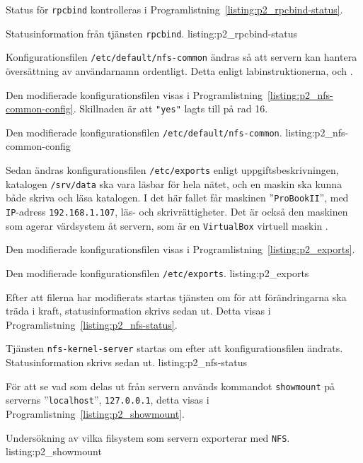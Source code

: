 Status för \texttt{rpcbind} kontrolleras i
Programlistning~\ref{listing:p2_rpcbind-status}.

            {Statusinformation från tjänsten \texttt{rpcbind}.}
            {listing:p2_rpcbind-status}


Konfigurationsfilen \texttt{/etc/default/nfs-common} ändras så att servern kan
hantera översättning av användarnamn ordentligt.
Detta enligt labinstruktionerna\cite{dvg001:instruktionerLab5},
\cite{ubuntu:NFSv4howto} och \cite{ubuntu:settingupNFShowto}.

Den modifierade konfigurationsfilen visas i
Programlistning~\ref{listing:p2_nfs-common-config}.
Skillnaden är att \texttt{"yes"} lagts till på rad 16.

            {Den modifierade konfigurationsfilen \texttt{/etc/default/nfs-common}.}
            {listing:p2_nfs-common-config}

Sedan ändras konfigurationsfilen \texttt{/etc/exports} enligt
uppgiftsbeskrivningen, katalogen \texttt{/srv/data} ska vara läsbar för hela
nätet, och en maskin ska kunna både skriva och läsa katalogen. 
I det här fallet får maskinen ''\texttt{ProBookII}'', med \texttt{IP}-adress
\texttt{192.168.1.107}, läs- och skrivrättigheter. Det är också den maskinen
som agerar värdsystem åt servern, som är en \texttt{VirtualBox} virtuell maskin .

Den modifierade konfigurationsfilen visas i
Programlistning~\ref{listing:p2_exports}.

            {Den modifierade konfigurationsfilen \texttt{/etc/exports}.}
            {listing:p2_exports}


Efter att filerna har modifierats startas tjänsten om för att förändringarna
ska träda i kraft, statusinformation skrivs sedan ut. Detta visas i
Programlistning~\ref{listing:p2_nfs-status}.

            {Tjänsten \texttt{nfs-kernel-server} startas om efter att
             konfigurationsfilen ändrats. Statusinformation skrivs sedan ut.}
            {listing:p2_nfs-status}


För att se vad som delas ut från servern används kommandot \texttt{showmount}
på serverns ''\texttt{localhost}'', \texttt{127.0.0.1}, detta visas i 
Programlistning~\ref{listing:p2_showmount}.

            {Undersökning av vilka filsystem som servern exporterar med 
             \texttt{NFS}.}
            {listing:p2_showmount}


